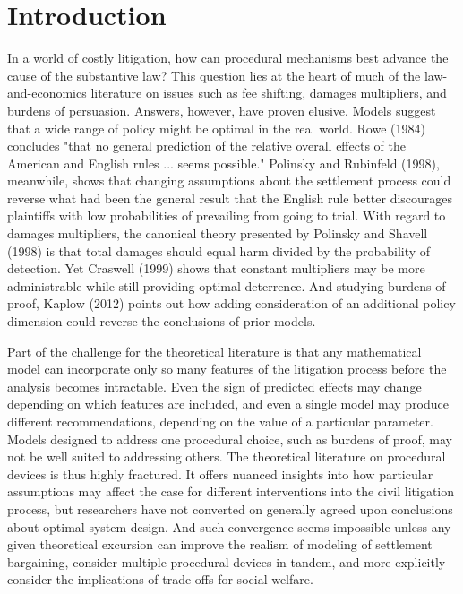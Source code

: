 \documentclass{article}
\begin{document}
\section{Introduction}

In a world of costly litigation, how can procedural mechanisms best advance the cause of the substantive law? This question lies at the heart of much of the law-and-economics literature on issues such as fee shifting, damages multipliers, and burdens of persuasion. Answers, however, have proven elusive. Models suggest that a wide range of policy might be optimal in the real world. Rowe (1984) concludes "that no general prediction of the relative overall effects of the American and English rules ... seems possible." Polinsky and Rubinfeld (1998), meanwhile, shows that changing assumptions about the settlement process could reverse what had been the general result that the English rule better discourages plaintiffs with low probabilities of prevailing from going to trial. With regard to damages multipliers, the canonical theory presented by Polinsky and Shavell (1998) is that total damages should equal harm divided by the probability of detection. Yet Craswell  (1999) shows that constant multipliers may be more administrable while still providing optimal deterrence. And studying burdens of proof, Kaplow (2012) points out how adding consideration of an additional policy dimension could reverse the conclusions of prior models. 

Part of the challenge for the theoretical literature is that any mathematical model can incorporate only so many features of the litigation process before the analysis becomes intractable. Even the sign of predicted effects may change depending on which features are included, and even a single model may produce different recommendations, depending on the value of a particular parameter. Models designed to address one procedural choice, such as burdens of proof, may not be well suited to addressing others. The theoretical literature on procedural devices is thus highly fractured. It offers nuanced insights into how particular assumptions may affect the case for different interventions into the civil litigation process, but researchers have not converted on generally agreed upon conclusions about optimal system design. And such convergence seems impossible unless any given theoretical excursion can improve the realism of modeling of settlement bargaining, consider multiple procedural devices in tandem, and more explicitly consider the implications of trade-offs for social welfare.
\end{document}
